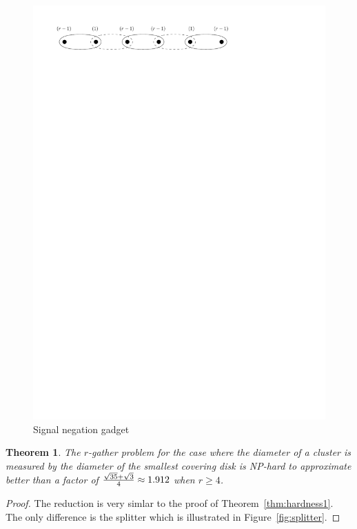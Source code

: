 \documentclass{acm_proc_article-sp}
\newtheorem{theorem}{Theorem}
\begin{document}
\begin{figure}[htbp]
\begin{center}
\includegraphics[scale=.6]{figs/negation}
\caption{Signal negation gadget}
\label{fig:negation}
\end{center}
\vspace{-5pt}
\end{figure}

\begin{theorem}\label{thm:hardness2}
The $r$-gather problem for the case where the diameter of a cluster is measured by the diameter of the smallest covering disk is NP-hard to approximate better than a factor of ${\sqrt{35}+\sqrt{3} \over 4} \approx 1.912$ when $r\geq4$.
\end{theorem}
\begin{proof}
The reduction is very simlar to the proof of Theorem~\ref{thm:hardness1}.  The only difference is the splitter which is illustrated in Figure~\ref{fig:splitter}.
\end{proof}
\end{document}
